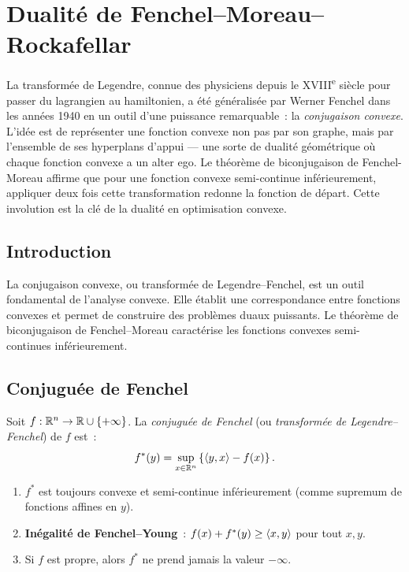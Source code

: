 \chapter{Dualit\'e de Fenchel--Moreau--Rockafellar}
\label{ch:fenchel}

La transform\'ee de Legendre, connue des physiciens depuis le XVIII\textsuperscript{e} si\`ecle pour passer du lagrangien au hamiltonien, a \'et\'e g\'en\'eralis\'ee par Werner Fenchel dans les ann\'ees 1940 en un outil d'une puissance remarquable~: la \emph{conjugaison convexe}. L'id\'ee est de repr\'esenter une fonction convexe non pas par son graphe, mais par l'ensemble de ses hyperplans d'appui --- une sorte de dualit\'e g\'eom\'etrique o\`u chaque fonction convexe a un alter ego. Le th\'eor\`eme de biconjugaison de Fenchel-Moreau affirme que pour une fonction convexe semi-continue inf\'erieurement, appliquer deux fois cette transformation redonne la fonction de d\'epart. Cette involution est la cl\'e de la dualit\'e en optimisation convexe.

\section{Introduction}

La conjugaison convexe, ou transform\'ee de Legendre--Fenchel, est un outil fondamental
de l'analyse convexe. Elle \'etablit une correspondance entre fonctions convexes et
permet de construire des probl\`emes duaux puissants. Le th\'eor\`eme de biconjugaison
de Fenchel--Moreau caract\'erise les fonctions convexes semi-continues inf\'erieurement.

\section{Conjugu\'ee de Fenchel}

\begin{definition}
Soit $f : \mathbb{R}^n \to \mathbb{R} \cup \{+\infty\}$. La \emph{conjugu\'ee de Fenchel} (ou
\emph{transform\'ee de Legendre--Fenchel}) de $f$ est~:
\[
    f^*(y) = \sup_{x \in \mathbb{R}^n} \left\{\langle y, x \rangle - f(x)\right\}.
\]
\end{definition}

\begin{proposition}
\begin{enumerate}
    \item $f^*$ est toujours convexe et semi-continue inf\'erieurement (comme supremum
          de fonctions affines en $y$).
    \item \textbf{In\'egalit\'e de Fenchel--Young}~:
    $f(x) + f^*(y) \geq \langle x, y \rangle$ pour tout $x, y$.
    \item Si $f$ est propre, alors $f^*$ ne prend jamais la valeur $-\infty$.
\end{enumerate}
\end{proposition}

